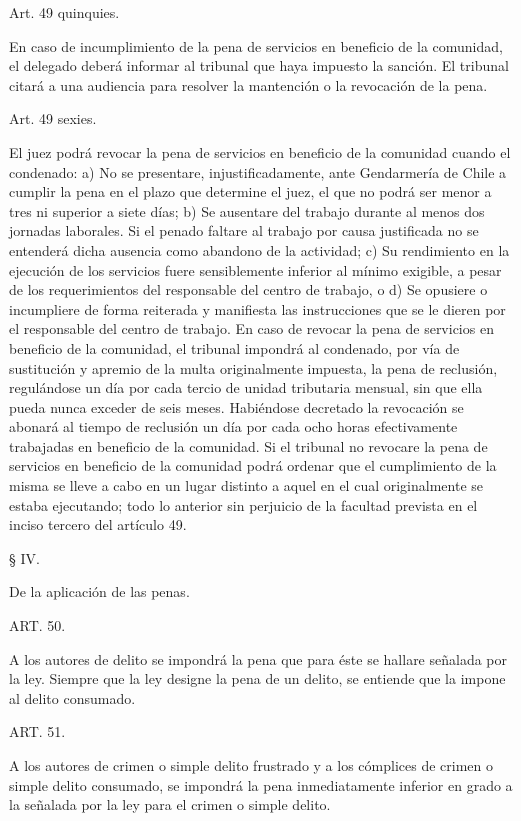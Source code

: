     Art. 49 quinquies.

    En caso de incumplimiento de la pena de servicios en beneficio de la comunidad, el delegado deberá informar al tribunal que haya impuesto la sanción.
    El tribunal citará a una audiencia para resolver la mantención o la revocación de la pena.



    Art. 49 sexies.

    El juez podrá revocar la pena de servicios en beneficio de la comunidad cuando el condenado:
    a) No se presentare, injustificadamente, ante Gendarmería de Chile a cumplir la pena en el plazo que determine el juez, el que no podrá ser menor a tres ni superior a siete días;
    b) Se ausentare del trabajo durante al menos dos jornadas laborales. Si el penado faltare al trabajo por causa justificada no se entenderá dicha ausencia como abandono de la actividad;
    c) Su rendimiento en la ejecución de los servicios fuere sensiblemente inferior al mínimo exigible, a pesar de los requerimientos del responsable del centro de trabajo, o
    d) Se opusiere o incumpliere de forma reiterada y manifiesta las instrucciones que se le dieren por el responsable del centro de trabajo.
    En caso de revocar la pena de servicios en beneficio de la comunidad, el tribunal impondrá al condenado, por vía de sustitución y apremio de la multa originalmente impuesta, la pena de reclusión, regulándose un día por cada tercio de unidad tributaria mensual, sin que ella pueda nunca exceder de seis meses.
    Habiéndose decretado la revocación se abonará al tiempo de reclusión un día por cada ocho horas efectivamente trabajadas en beneficio de la comunidad.
    Si el tribunal no revocare la pena de servicios en beneficio de la comunidad podrá ordenar que el cumplimiento de la misma se lleve a cabo en un lugar distinto a aquel en el cual originalmente se estaba ejecutando; todo lo anterior sin perjuicio de la facultad prevista en el inciso tercero del artículo 49.



    § IV.

    De la aplicación de las penas.


    ART. 50.

    A los autores de delito se impondrá la pena que para éste se hallare señalada por la ley.
    Siempre que la ley designe la pena de un delito, se entiende que la impone al delito consumado.


    ART. 51.

    A los autores de crimen o simple delito frustrado y a los cómplices de crimen o simple delito consumado, se impondrá la pena inmediatamente inferior en grado a la señalada por la ley para el crimen o simple delito.



